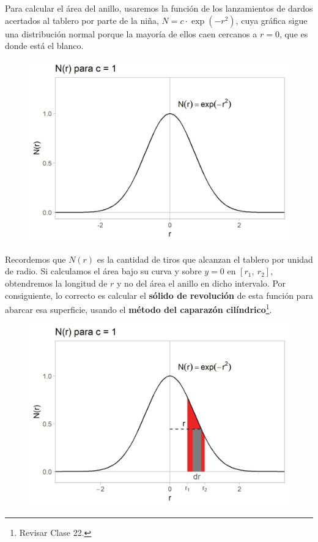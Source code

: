 \documentclass[12pt]{article}
\begin{document}
Para calcular el área del anillo, usaremos la función de los lanzamientos de dardos acertados al tablero por parte de la niña, $N = c \cdot \exp(-r^{2})$, cuya gráfica sigue una distribución normal porque la mayoría de ellos caen cercanos a $r = 0$, que es donde está el blanco.

\begin{figure}[hbt!]
\centering
\includegraphics[scale=0.8]{img/darts-prob-example-4.jpg}
\end{figure}

Recordemos que $N(r)$ es la cantidad de tiros que alcanzan el tablero por unidad de radio. Si calculamos el área bajo su curva y sobre $y = 0$ en $[r_{1}, \ r_{2}]$, obtendremos la longitud de $r$ y no del área el anillo en dicho intervalo. Por consiguiente, lo correcto es calcular el \textbf{sólido de revolución} de esta función para abarcar esa superficie, usando el \textbf{método del caparazón cilíndrico}\footnote{Revisar Clase 22.}.

\newpage

\begin{figure}[hbt!]
\centering
\includegraphics[scale=0.8]{img/darts-prob-example-5.jpg}
\end{figure}
\end{document}
